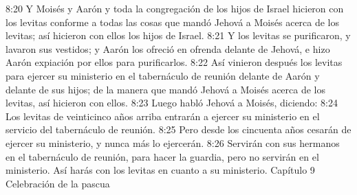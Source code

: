 8:20 Y Moisés y Aarón y toda la congregación de los hijos de Israel hicieron con los levitas conforme a todas las cosas que mandó Jehová a Moisés acerca de los levitas; así hicieron con ellos los hijos de Israel.  
8:21 Y los levitas se purificaron, y lavaron sus vestidos; y Aarón los ofreció en ofrenda delante de Jehová, e hizo Aarón expiación por ellos para purificarlos.  
8:22 Así vinieron después los levitas para ejercer su ministerio en el tabernáculo de reunión delante de Aarón y delante de sus hijos; de la manera que mandó Jehová a Moisés acerca de los levitas, así hicieron con ellos.  
8:23 Luego habló Jehová a Moisés, diciendo:  
8:24 Los levitas de veinticinco años arriba entrarán a ejercer su ministerio en el servicio del tabernáculo de reunión.  
8:25 Pero desde los cincuenta años cesarán de ejercer su ministerio, y nunca más lo ejercerán.  
8:26 Servirán con sus hermanos en el tabernáculo de reunión, para hacer la guardia, pero no servirán en el ministerio. Así harás con los levitas en cuanto a su ministerio.  
Capítulo 9
Celebración de la pascua  

